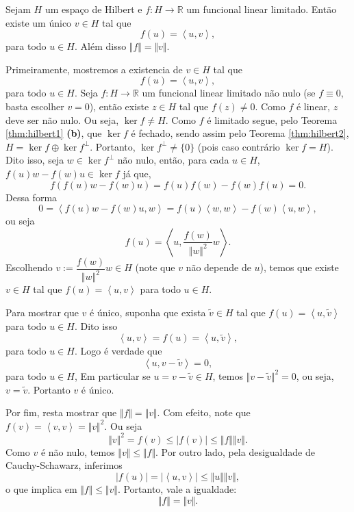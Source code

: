 \documentclass[a4paper, 11pt]{book}
\theoremstyle{definition}
\newcommand{\bR}{\mathbb{R}}
\begin{document}
\begin{tbox} \label{thm:representacao-riesz}
    Sejam $H$ um espaço de Hilbert e $f : H \to \bR$ um funcional linear limitado.
    Então existe um único $v \in H$ tal que
    \[
        f(u) = \left\langle u, v\right\rangle,
    \]
    para todo $u \in H$.
    Além disso $\Vert f \Vert = \Vert v \Vert$.
\end{tbox}
\begin{prf}
    Primeiramente, mostremos a existencia de $v \in H$ tal que
    \[
        f(u) = \left\langle u,v \right\rangle,
    \]
    para todo $u \in H$.
    Seja $f : H \to \bR$ um funcional linear limitado não nulo (se $f \equiv 0$, basta escolher $v = 0$), então existe $z \in H$ tal que $f(z) \neq 0$. 
    Como $f$ é linear, $z$ deve ser não nulo. Ou seja, $\ker f \neq H$.
    Como $f$ é limitado segue, pelo Teorema \ref{thm:hilbert1} \textbf{(b)}, que $\ker f$ é fechado, sendo assim pelo Teorema \ref{thm:hilbert2}, $H = \ker f \oplus \ker f ^\perp$.
    Portanto, $\ker f ^\perp \neq \{0\}$ (pois caso contrário $\ker f = H$).
    Dito isso, seja $w \in \ker f ^\perp$ não nulo, então, para cada $u \in H$, $f(u) w - f(w)u \in \ker f$ já que,
    \[
        f(f(u)w - f(w)u) = f(u) f(w) - f(w)f(u) = 0.
    \]
    Dessa forma
    \[
        0 = \left\langle f(u)w - f(w)u, w \right\rangle = f(u) \left\langle w,w \right\rangle - f(w) \left\langle u,w \right\rangle,
    \]
    ou seja
    \[
        f(u) = \left\langle u, \frac{f(w)}{\Vert w \Vert^2}w \right\rangle.
    \]
    Escolhendo $v := \dfrac{f(w)}{\Vert w \Vert^2} w \in H$ (note que $v$ não depende de $u$), temos que existe $v \in H$ tal que $f(u) = \left\langle u,v \right\rangle$ para todo $u \in H$.

    Para mostrar que $v$ é único, suponha que exista $\tilde v \in H$ tal que $f(u) = \left\langle u, \tilde v \right\rangle$ para todo $u \in H$.
    Dito isso
    \[
        \left\langle u, v \right\rangle = f(u) = \left\langle u,\tilde v \right\rangle,
    \] 
    para todo $u \in H$. Logo é verdade que
    \[
        \left\langle u , v - \tilde v \right\rangle = 0,
    \]
    para todo $u \in H$, Em particular se $u = v - \tilde v \in H$, temos $\Vert v - \tilde v \Vert^2 = 0$, ou seja, $v = \tilde v$. Portanto $v$ é único.

    Por fim, resta mostrar que $\Vert f \Vert = \Vert v \Vert$.
    Com efeito, note que $f(v) = \left\langle v, v \right\rangle = \Vert v \Vert^2$. Ou seja
    \[
        \Vert v \Vert^2 = f(v) \leqslant |f(v)| \leqslant \Vert f \Vert \Vert v \Vert.
    \]
    Como $v$ é não nulo, temos $\Vert v \Vert \leqslant \Vert f \Vert$.
    Por outro lado, pela desigualdade de Cauchy-Schawarz, inferimos
    \[
        |f(u)| = |\left\langle u,v \right\rangle| \leqslant \Vert u \Vert \Vert v \Vert,
    \]
    o que implica em $\Vert f \Vert \leqslant \Vert v \Vert$.
    Portanto, vale a igualdade:
    \[
        \Vert f \Vert = \Vert v \Vert.
    \]
\end{prf}
\end{document}
